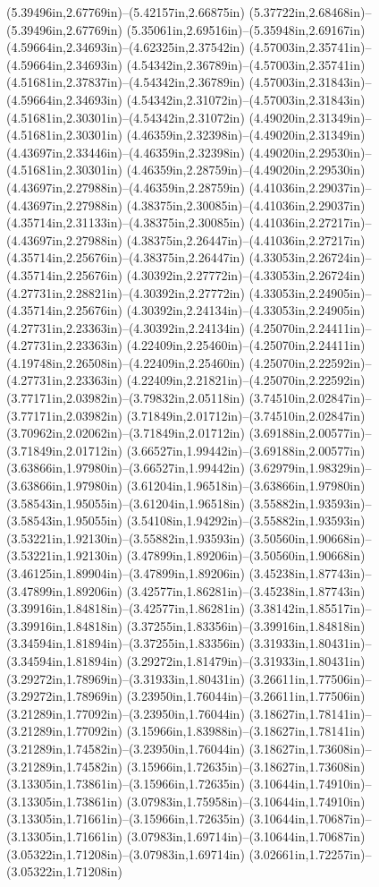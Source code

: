 (5.39496in,2.67769in)--(5.42157in,2.66875in) (5.37722in,2.68468in)--(5.39496in,2.67769in) (5.35061in,2.69516in)--(5.35948in,2.69167in) (4.59664in,2.34693in)--(4.62325in,2.37542in) (4.57003in,2.35741in)--(4.59664in,2.34693in) (4.54342in,2.36789in)--(4.57003in,2.35741in) (4.51681in,2.37837in)--(4.54342in,2.36789in) (4.57003in,2.31843in)--(4.59664in,2.34693in) (4.54342in,2.31072in)--(4.57003in,2.31843in) (4.51681in,2.30301in)--(4.54342in,2.31072in) (4.49020in,2.31349in)--(4.51681in,2.30301in) (4.46359in,2.32398in)--(4.49020in,2.31349in) (4.43697in,2.33446in)--(4.46359in,2.32398in) (4.49020in,2.29530in)--(4.51681in,2.30301in) (4.46359in,2.28759in)--(4.49020in,2.29530in) (4.43697in,2.27988in)--(4.46359in,2.28759in) (4.41036in,2.29037in)--(4.43697in,2.27988in) (4.38375in,2.30085in)--(4.41036in,2.29037in) (4.35714in,2.31133in)--(4.38375in,2.30085in) (4.41036in,2.27217in)--(4.43697in,2.27988in) (4.38375in,2.26447in)--(4.41036in,2.27217in) (4.35714in,2.25676in)--(4.38375in,2.26447in) (4.33053in,2.26724in)--(4.35714in,2.25676in) (4.30392in,2.27772in)--(4.33053in,2.26724in) (4.27731in,2.28821in)--(4.30392in,2.27772in) (4.33053in,2.24905in)--(4.35714in,2.25676in) (4.30392in,2.24134in)--(4.33053in,2.24905in) (4.27731in,2.23363in)--(4.30392in,2.24134in) (4.25070in,2.24411in)--(4.27731in,2.23363in) (4.22409in,2.25460in)--(4.25070in,2.24411in) (4.19748in,2.26508in)--(4.22409in,2.25460in) (4.25070in,2.22592in)--(4.27731in,2.23363in) (4.22409in,2.21821in)--(4.25070in,2.22592in) (3.77171in,2.03982in)--(3.79832in,2.05118in) (3.74510in,2.02847in)--(3.77171in,2.03982in) (3.71849in,2.01712in)--(3.74510in,2.02847in) (3.70962in,2.02062in)--(3.71849in,2.01712in) (3.69188in,2.00577in)--(3.71849in,2.01712in) (3.66527in,1.99442in)--(3.69188in,2.00577in) (3.63866in,1.97980in)--(3.66527in,1.99442in) (3.62979in,1.98329in)--(3.63866in,1.97980in) (3.61204in,1.96518in)--(3.63866in,1.97980in) (3.58543in,1.95055in)--(3.61204in,1.96518in) (3.55882in,1.93593in)--(3.58543in,1.95055in) (3.54108in,1.94292in)--(3.55882in,1.93593in) (3.53221in,1.92130in)--(3.55882in,1.93593in) (3.50560in,1.90668in)--(3.53221in,1.92130in) (3.47899in,1.89206in)--(3.50560in,1.90668in) (3.46125in,1.89904in)--(3.47899in,1.89206in) (3.45238in,1.87743in)--(3.47899in,1.89206in) (3.42577in,1.86281in)--(3.45238in,1.87743in) (3.39916in,1.84818in)--(3.42577in,1.86281in) (3.38142in,1.85517in)--(3.39916in,1.84818in) (3.37255in,1.83356in)--(3.39916in,1.84818in) (3.34594in,1.81894in)--(3.37255in,1.83356in) (3.31933in,1.80431in)--(3.34594in,1.81894in) (3.29272in,1.81479in)--(3.31933in,1.80431in) (3.29272in,1.78969in)--(3.31933in,1.80431in) (3.26611in,1.77506in)--(3.29272in,1.78969in) (3.23950in,1.76044in)--(3.26611in,1.77506in) (3.21289in,1.77092in)--(3.23950in,1.76044in) (3.18627in,1.78141in)--(3.21289in,1.77092in) (3.15966in,1.83988in)--(3.18627in,1.78141in) (3.21289in,1.74582in)--(3.23950in,1.76044in) (3.18627in,1.73608in)--(3.21289in,1.74582in) (3.15966in,1.72635in)--(3.18627in,1.73608in) (3.13305in,1.73861in)--(3.15966in,1.72635in) (3.10644in,1.74910in)--(3.13305in,1.73861in) (3.07983in,1.75958in)--(3.10644in,1.74910in) (3.13305in,1.71661in)--(3.15966in,1.72635in) (3.10644in,1.70687in)--(3.13305in,1.71661in) (3.07983in,1.69714in)--(3.10644in,1.70687in) (3.05322in,1.71208in)--(3.07983in,1.69714in) (3.02661in,1.72257in)--(3.05322in,1.71208in) 